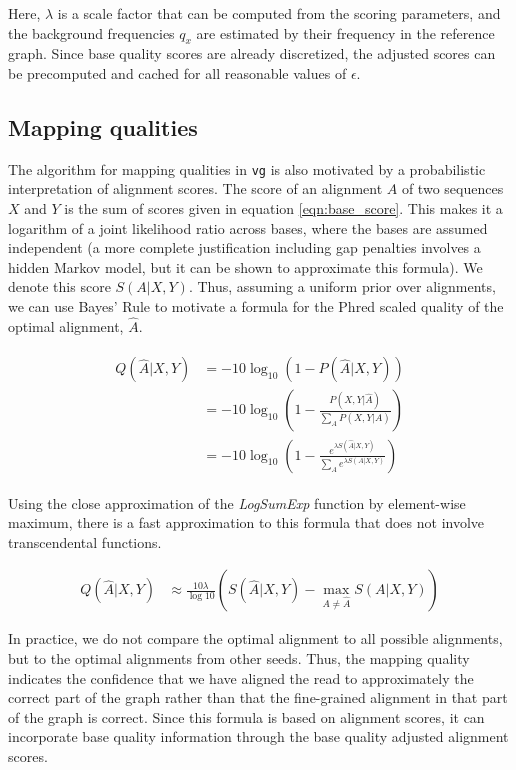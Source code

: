 Here, $\lambda$ is a scale factor that can be computed from the scoring parameters, and the background frequencies $q_x$ are estimated by their frequency in the reference graph. Since base quality scores are already discretized, the adjusted scores can be precomputed and cached for all reasonable values of $\epsilon$. 

\subsection{Mapping qualities}
\label{sec:mapping_quality}

The algorithm for mapping qualities in {\tt vg} is also motivated by a probabilistic interpretation of alignment scores.
The score of an alignment $A$ of two sequences $X$ and $Y$ is the sum of scores given in equation \ref{eqn:base_score}.
This makes it a logarithm of a joint likelihood ratio across bases, where the bases are assumed independent (a more complete justification including gap penalties involves a hidden Markov model, but it can be shown to approximate this formula).
We denote this score $S(A|X,Y)$.
Thus, assuming a uniform prior over alignments, we can use Bayes' Rule to motivate a formula for the Phred scaled quality of the optimal alignment, $\hat A$.

\begin{align}
\begin{split}
    Q(\hat A|X,Y) &= -10\log_{10}(1 - P(\hat A|X,Y)) \\
    &= -10 \log_{10}\left(1 - \frac{P(X,Y|\hat A)}{\sum_{A}P(X,Y|A)} \right) \\
    &= -10 \log_{10}\left(1 - \frac{e^{\lambda S(\hat A|X,Y)}}{\sum_{A}e^{\lambda S(A|X,Y)}} \right) \label{basicqualityscore}
\end{split}
\end{align}

Using the close approximation of the \emph{LogSumExp} function by element-wise maximum, there is a fast approximation to this formula that does not involve transcendental functions.

\begin{align}
    Q(\hat A|X,Y) &\approx \frac{10\lambda}{\log 10}\left( S(\hat A | X,Y) - \max_{A \neq \hat A}S(A| X,Y)\right)
\end{align}

In practice, we do not compare the optimal alignment to all possible alignments, but to the optimal alignments from other seeds. Thus, the mapping quality indicates the confidence that we have aligned the read to approximately the correct part of the graph rather than that the fine-grained alignment in that part of the graph is correct. Since this formula is based on alignment scores, it can incorporate base quality information through the base quality adjusted alignment scores.


